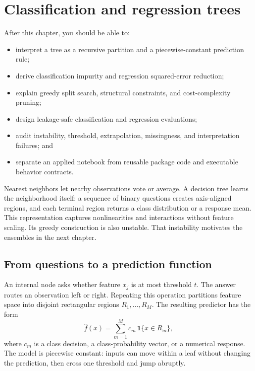 \chapter{Classification and regression trees}
\label{ch:decision-trees}

\begin{learningobjectives}
After this chapter, you should be able to:
\begin{itemize}
  \item interpret a tree as a recursive partition and a piecewise-constant
  prediction rule;
  \item derive classification impurity and regression squared-error reduction;
  \item explain greedy split search, structural constraints, and
  cost-complexity pruning;
  \item design leakage-safe classification and regression evaluations;
  \item audit instability, threshold, extrapolation, missingness, and
  interpretation failures; and
  \item separate an applied notebook from reusable package code and executable
  behavior contracts.
\end{itemize}
\end{learningobjectives}

\begin{chapterconnection}
Nearest neighbors let nearby observations vote or average. A decision tree
learns the neighborhood itself: a sequence of binary questions creates
axis-aligned regions, and each terminal region returns a class distribution or
a response mean. This representation captures nonlinearities and interactions
without feature scaling. Its greedy construction is also unstable. That
instability motivates the ensembles in the next chapter.
\end{chapterconnection}

\section{From questions to a prediction function}

An internal node asks whether feature $x_j$ is at most threshold $t$. The
answer routes an observation left or right. Repeating this operation partitions
feature space into disjoint rectangular regions $R_1,\dots,R_M$. The resulting
predictor has the form
\[
  \widehat f(x)=\sum_{m=1}^{M}c_m\,\mathbf 1\{x\in R_m\},
\]
where $c_m$ is a class decision, a class-probability vector, or a numerical
response. The model is piecewise constant: inputs can move within a leaf
without changing the prediction, then cross one threshold and jump abruptly.

